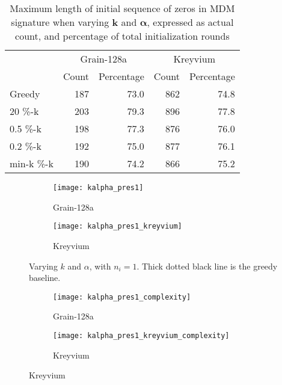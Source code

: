 {%
\begin{table}[htb]
	\centering
    \caption{Maximum length of initial sequence of zeros in MDM signature when varying $\bm{k}$ and $\bm{\alpha}$, expressed as actual count, and percentage of total initialization rounds}
    \begin{tabular}{lrrrr}
    	\toprule
        & \multicolumn{2}{c}{Grain-128a} & \multicolumn{2}{c}{Kreyvium} \\
        \cmidrule(r){2-3} \cmidrule(l){4-5}
                  & Count & Percentage & Count & Percentage \\
        \midrule
        Greedy & 187 & 73.0 & 862 & 74.8 \\
        20 \%-k & 203 & 79.3 & 896 & 77.8 \\
        0.5 \%-k & 198 & 77.3 & 876 & 76.0 \\
        0.2 \%-k & 192 & 75.0 & 877 & 76.1 \\ 
        min-k \%-k & 190 & 74.2 & 866 & 75.2 \\
        \bottomrule
    \end{tabular}
    \label{tbl:kalpha}
\end{table}

\begin{figure}[htbp]
	\centering
	\begin{subfigure}[b]{0.5\textwidth}
		\texttt{[image: kalpha\_pres1]}
		\captionsetup{singlelinecheck=true}
		\caption{Grain-128a}
		\label{fig:kalphagrain128a}
	\end{subfigure}%
	\begin{subfigure}[b]{0.5\textwidth}
		\texttt{[image: kalpha\_pres1\_kreyvium]}
		\captionsetup{singlelinecheck=true}
		\caption{Kreyvium}
		\label{fig:kalphakreyvium}
	\end{subfigure}	
	\caption{Varying $k$ and $\alpha$, with $n_i=1$. Thick dotted black line is the greedy baseline.}
	\label{fig:kalpha}
\end{figure}

\begin{figure}[htbp]
	\centering
	\begin{subfigure}[b]{0.5\textwidth}
		\texttt{[image: kalpha\_pres1\_complexity]}
		\captionsetup{singlelinecheck=true}
		\caption{Grain-128a}
		\label{fig:kalphacomplexitygrain128a}
	\end{subfigure}%
	\begin{subfigure}[b]{0.5\textwidth}
		\texttt{[image: kalpha\_pres1\_kreyvium\_complexity]}
		\captionsetup{singlelinecheck=true}
		\caption{Kreyvium}
		\label{fig:kalphacomplexitykreyvium}
	\end{subfigure}
	

\end{figure}}
